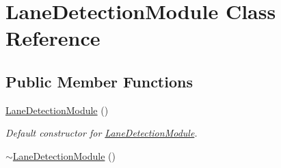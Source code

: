 \hypertarget{classLaneDetectionModule}{}\section{Lane\+Detection\+Module Class Reference}
\label{classLaneDetectionModule}
\subsection*{Public Member Functions}
\begin{DoxyCompactItemize}
\item 
\hyperlink{classLaneDetectionModule_a044d95cfc95e4dba1c96ee62c50b6df6}{Lane\+Detection\+Module} ()\hypertarget{classLaneDetectionModule_a044d95cfc95e4dba1c96ee62c50b6df6}{}\label{classLaneDetectionModule_a044d95cfc95e4dba1c96ee62c50b6df6}

\begin{DoxyCompactList}\small\item\em Default constructor for \hyperlink{classLaneDetectionModule}{Lane\+Detection\+Module}. \end{DoxyCompactList}\item 
\hyperlink{classLaneDetectionModule_abe9179d4df794c39d6fe246ad7a0d64e}{$\sim$\+Lane\+Detection\+Module} ()\hypertarget{classLaneDetectionModule_abe9179d4df794c39d6fe246ad7a0d64e}{}\label{classLaneDetectionModule_abe9179d4df794c39d6fe246ad7a0d64e}


\end{DoxyCompactItemize}
